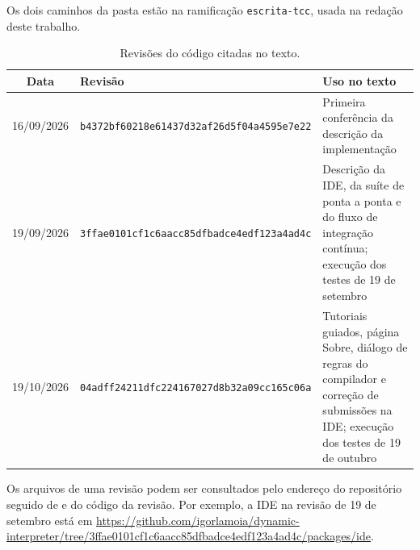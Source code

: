 Os dois caminhos da pasta  estão na ramificação \texttt{escrita-tcc}, usada na redação deste trabalho.

\begin{table}[htbp]
\centering
\caption{Revisões do código citadas no texto.}
\label{tab:ap-repositorio-revisoes}
\footnotesize
\renewcommand{\arraystretch}{1.2}
\begin{tabular}{|c|p{6.6cm}|p{5.2cm}|}
\hline
\textbf{Data} & \textbf{Revisão} & \textbf{Uso no texto} \\\hline
16/09/2026 & \texttt{b4372bf60218e61437d32af26d5f04a4595e7e22} & Primeira conferência da descrição da implementação \\\hline
19/09/2026 & \texttt{3ffae0101cf1c6aacc85dfbadce4edf123a4ad4c} & Descrição da IDE, da suíte de ponta a ponta e do fluxo de integração contínua; execução dos testes de 19 de setembro \\\hline
19/10/2026 & \texttt{04adff24211dfc224167027d8b32a09cc165c06a} & Tutoriais guiados, página Sobre, diálogo de regras do compilador e correção de submissões na IDE; execução dos testes de 19 de outubro \\\hline
\end{tabular}
\end{table}

Os arquivos de uma revisão podem ser consultados pelo endereço do repositório seguido de  e do código da revisão. Por exemplo, a IDE na revisão de 19 de setembro está em \url{https://github.com/igorlamoia/dynamic-interpreter/tree/3ffae0101cf1c6aacc85dfbadce4edf123a4ad4c/packages/ide}.
